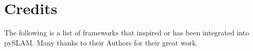 \documentclass{article}
\begin{document}
%




\hypertarget{credits}{%
\section{Credits}\label{credits}}

The following is a list of frameworks that inspired or has been integrated into pySLAM. Many thanks to their Authors for their great work.
\end{document}
